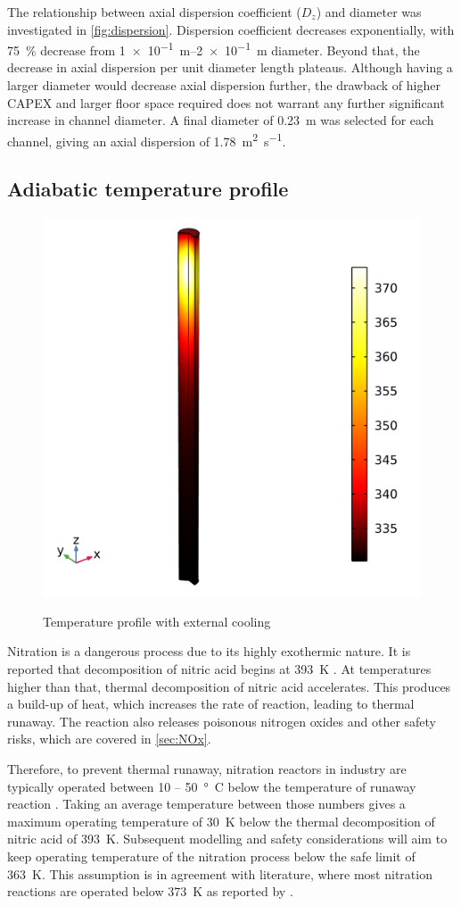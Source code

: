 The relationship between axial dispersion coefficient ($D_z$) and diameter was investigated in \cref{fig:dispersion}. Dispersion coefficient decreases exponentially, with \SI{75}{\%} decrease from \SIrange{1e-1}{2e-1}{\m} diameter. Beyond that, the decrease in axial dispersion per unit diameter length plateaus. Although having a larger diameter would decrease axial dispersion further, the drawback of higher CAPEX and larger floor space required does not warrant any further significant increase in channel diameter. A final diameter of \SI{0.23}{\metre} was selected for each channel, giving an axial dispersion of \SI{1.78}{\metre \squared \per \second}. 

\subsection{Adiabatic temperature profile}

\label{sec:adiabatic}

\begin{figure}
    \vspace{-\intextsep}
    \includegraphics[width=0.3\linewidth]{figures/simple-tube-temperature.png}
    \label{fig:Adiabatic-with-cooling}
    \caption{Temperature profile with external cooling}
\end{figure} 
Nitration is a dangerous process due to its highly exothermic nature. It is reported that decomposition of nitric acid begins at \SI{393}{\K} \cite{di_miceli_raimondi_safety_2015}. At temperatures higher than that, thermal decomposition of nitric acid accelerates. This produces a build-up of heat, which increases the rate of reaction, leading to thermal runaway. The reaction also releases poisonous nitrogen oxides and other safety risks, which are covered in \cref{sec:NOx}. 

Therefore, to prevent thermal runaway, nitration reactors in industry are typically operated between \si{10} – \SI{50}{°C} below the temperature of runaway reaction \cite{noauthor_lees_2012}. Taking an average temperature between those numbers gives a maximum operating temperature of \SI{30}{\K} below the thermal decomposition of nitric acid of \SI{393}{\K}. Subsequent modelling and safety considerations will aim to keep operating temperature of the nitration process below the safe limit of \SI{363}{\K}. This assumption is in agreement with literature, where most nitration reactions are operated below \SI{373}{\K} as reported by \textcite{chen_experimental_1998}.

